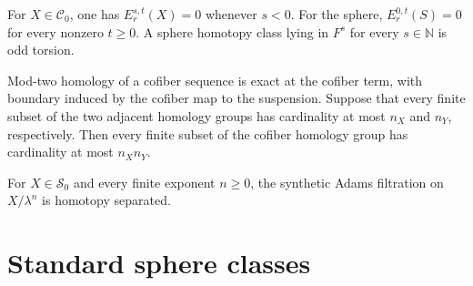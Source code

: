 \begin{theorem}
\label{sem:AdamsSynthetic:classical-vanishing}
For $X\in\mathcal C_0$, one has $E_r^{s,t}(X)=0$ whenever $s<0$. For the sphere, $E_r^{0,t}(S)=0$ for every nonzero $t\geq0$. A sphere homotopy class lying in $F^s$ for every $s\in\mathbb N$ is odd torsion.
\end{theorem}

\begin{theorem}
\label{sem:AdamsSynthetic:homology-exact}
Mod-two homology of a cofiber sequence is exact at the cofiber term, with boundary induced by the cofiber map to the suspension. Suppose that every finite subset of the two adjacent homology groups has cardinality at most $n_X$ and $n_Y$, respectively. Then every finite subset of the cofiber homology group has cardinality at most $n_Xn_Y$.
\end{theorem}

\begin{theorem}
\label{sem:AdamsSynthetic:finite-quotient-separation}
For $X\in\mathcal S_0$ and every finite exponent $n\geq0$, the synthetic Adams filtration on $X/\lambda^n$ is homotopy separated.
\end{theorem}

\section{Standard sphere classes}

